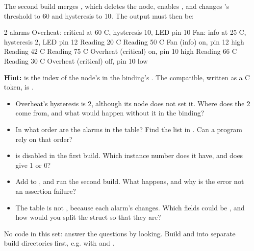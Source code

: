 \noindent The second build merges , which
deletes the  node, enables , and changes ’s threshold to 60 and
hysteresis to 10. The output must then be:

\begin{console}
2 alarms
Overheat: critical at 60 C, hysteresis 10, LED pin 10
Fan: info at 25 C, hysteresis 2, LED pin 12
Reading 20 C
Reading 50 C
  Fan (info) on, pin 12 high
Reading 42 C
Reading 75 C
  Overheat (critical) on, pin 10 high
Reading 66 C
Reading 30 C
  Overheat (critical) off, pin 10 low
\end{console}

\noindent \textbf{Hint:}  is the index of the node’s
 in the binding’s . The compatible, written as a C token, is
.

\begin{itemize}
  \item Overheat’s hysteresis is 2, although its node does not set it. Where does the 2 come from, and what
    would happen without it in the binding?
  \item In what order are the alarms in the table? Find the list in
    . Can a program rely on that
    order?
  \item {} is disabled in the first build. Which instance number does it have, and does
     give 1 or 0?
  \item Add  to , and run the
    second build. What happens, and why is the error not an assertion failure?
  \item The table is not , because each alarm’s  changes. Which fields could be
    , and how would you split the struct so that they are?
\end{itemize}

\label{c2:set:4}
No code in this set: answer the questions by looking. Build  and 
into separate build directories first, e.g. with  and .

\label{c2:ex:4.1}

